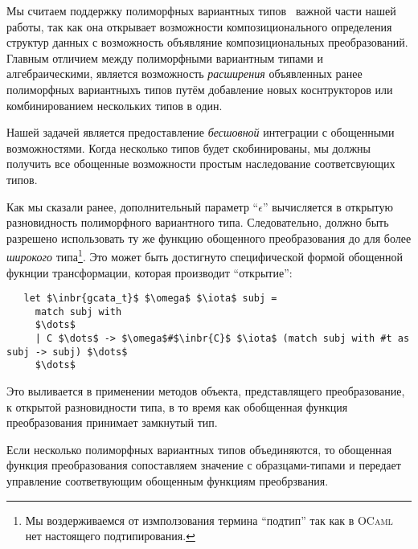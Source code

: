Мы считаем поддержку полиморфных вариантных типов~\cite{PolyVar,PolyVarReuse} важной части нашей работы, так как она открывает возможности 
композиционального определения структур данных с возможность объявляние композициональных преобразований.
Главным отличием между полиморфными вариантным типами  и алгебраическими, является возможность 
\emph{расширения} объявленных ранее полиморфных вариантныхъ типов путём добавление новых коснтрукторов или комбинированием нескольких типов в один. 

Нашей задачей является предоставление  \emph{бесшовной} интеграции с обощенными возможностями. Когда несколько типов будет скобинированы, мы должны получить все обощенные возможности простым наследование соответсвующих типов.

Как мы сказали ранее, дополнительный параметр  ``$\epsilon$'' вычисляется в открытую разновидность полиморфного вариантного типа. Следовательно, должно быть разрешено использовать ту же функцию обощенного преобразования до для более \emph{широкого} типа\footnote{Мы воздерживаемся от измползования термина ``подтип'' так как в \textsc{OCaml} нет настоящего подтипирования.}. 
Это может быть достигнуто специфической формой обощенной фукнции трансформации, которая производит ``открытие'':

\begin{lstlisting}
   let $\inbr{gcata_t}$ $\omega$ $\iota$ subj =
     match subj with
     $\dots$
     | C $\dots$ -> $\omega$#$\inbr{C}$ $\iota$ (match subj with #t as subj -> subj) $\dots$
     $\dots$
\end{lstlisting}

Это выливается в применении методов объекта, представлящего преобразование, к открытой разновидности типа, в то время как обобщенная функция преобразования принимает замкнутый тип.

Если несколько полиморфных вариантных типов объединяются, то обощенная функция преобразования сопоставляем значение с образцами-типами и передает управление соответвующим обощенным функциям преобрзвания.

